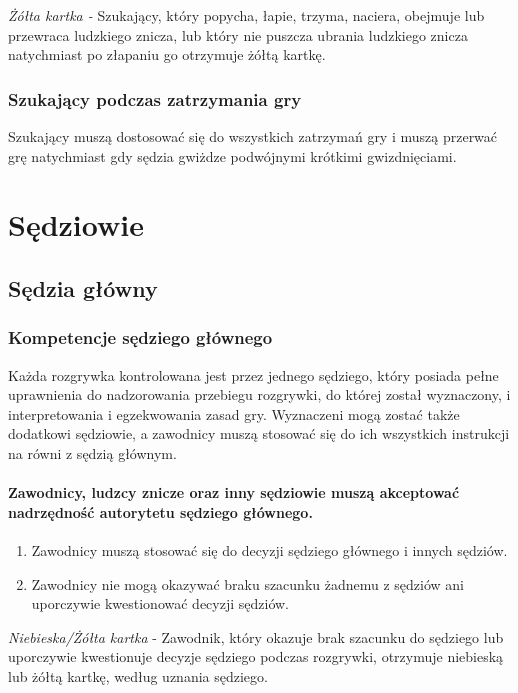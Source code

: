\documentclass[12pt]{article}
\begin{document}
\emph{Żółta kartka -} Szukający, który popycha, łapie, trzyma, naciera,
obejmuje lub przewraca ludzkiego znicza, lub który nie puszcza ubrania
ludzkiego znicza natychmiast po złapaniu go otrzymuje żółtą kartkę.

\subsubsection{Szukający podczas zatrzymania gry}

Szukający muszą dostosować się do wszystkich zatrzymań gry i muszą
przerwać grę natychmiast gdy sędzia gwiżdze podwójnymi krótkimi
gwizdnięciami.

\pagebreak
\section{Sędziowie}

\subsection{Sędzia główny}

\subsubsection{Kompetencje sędziego głównego}

Każda rozgrywka kontrolowana jest przez jednego sędziego, który posiada
pełne uprawnienia do nadzorowania przebiegu rozgrywki, do której został
wyznaczony, i interpretowania i egzekwowania zasad gry. Wyznaczeni mogą
zostać także dodatkowi sędziowie, a zawodnicy muszą stosować się do ich
wszystkich instrukcji na równi z sędzią głównym.

\paragraph{Zawodnicy, ludzcy znicze oraz inny sędziowie muszą
akceptować nadrzędność autorytetu sędziego głównego.}

\begin{enumerate}
\item
    Zawodnicy muszą stosować się do decyzji sędziego głównego i innych
  sędziów.
  \item
    Zawodnicy nie mogą okazywać braku szacunku żadnemu z sędziów ani
  uporczywie kwestionować decyzji sędziów.
  \end{enumerate}

\emph{Niebieska/Żółta kartka} - Zawodnik, który okazuje brak szacunku do
sędziego lub uporczywie kwestionuje decyzje sędziego podczas rozgrywki,
otrzymuje niebieską lub żółtą kartkę, według uznania sędziego.
\end{document}

